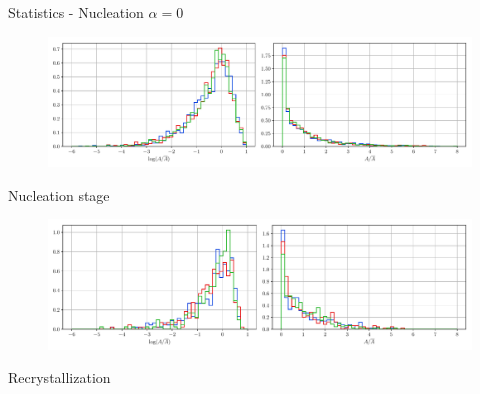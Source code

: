 \documentclass[usenames,dvipsnames]{beamer}
\begin{document}
\begin{frame}{Statistics - Nucleation $\alpha = 0$}
\small
\centering
    \vspace{-0.5em}
    \begin{figure}
        \centering
        \includegraphics[scale=0.35]{figures/stored_energy/SE/areas/000110_nuclconstant_set.pdf}
    \end{figure}
    \vspace{-1em}
    Nucleation stage
    \begin{figure}
        \centering
        \includegraphics[scale=0.35]{figures/stored_energy/SE/areas/000240_nuclconstant_set.pdf}
    \end{figure}
    \vspace{-1em}
    Recrystallization
\end{frame}
\end{document}
